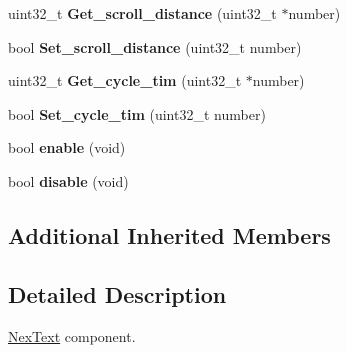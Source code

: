 \begin{DoxyCompactItemize}
\item 
\hypertarget{class_nex_scrolltext_a46ac65d7561b32fd4c5ac2f0aacf9bf1}{uint32\+\_\+t {\bfseries Get\+\_\+scroll\+\_\+distance} (uint32\+\_\+t $\ast$number)}\label{class_nex_scrolltext_a46ac65d7561b32fd4c5ac2f0aacf9bf1}

\item 
\hypertarget{class_nex_scrolltext_a039a5f4dae5046142c4605097593545c}{bool {\bfseries Set\+\_\+scroll\+\_\+distance} (uint32\+\_\+t number)}\label{class_nex_scrolltext_a039a5f4dae5046142c4605097593545c}

\item 
\hypertarget{class_nex_scrolltext_a5d881dcad2360b42327cf95f8e91955f}{uint32\+\_\+t {\bfseries Get\+\_\+cycle\+\_\+tim} (uint32\+\_\+t $\ast$number)}\label{class_nex_scrolltext_a5d881dcad2360b42327cf95f8e91955f}

\item 
\hypertarget{class_nex_scrolltext_ad639bf79aa963966241db4f45c7c8bd6}{bool {\bfseries Set\+\_\+cycle\+\_\+tim} (uint32\+\_\+t number)}\label{class_nex_scrolltext_ad639bf79aa963966241db4f45c7c8bd6}

\item 
\hypertarget{class_nex_scrolltext_a6941c1a200d0e4f913c5b37a7114b33a}{bool {\bfseries enable} (void)}\label{class_nex_scrolltext_a6941c1a200d0e4f913c5b37a7114b33a}

\item 
\hypertarget{class_nex_scrolltext_a909b5ec3d9b01a29715bf616dfafaeee}{bool {\bfseries disable} (void)}\label{class_nex_scrolltext_a909b5ec3d9b01a29715bf616dfafaeee}

\end{DoxyCompactItemize}
\subsection*{Additional Inherited Members}


\subsection{Detailed Description}
\hyperlink{class_nex_text}{Nex\+Text} component. 


